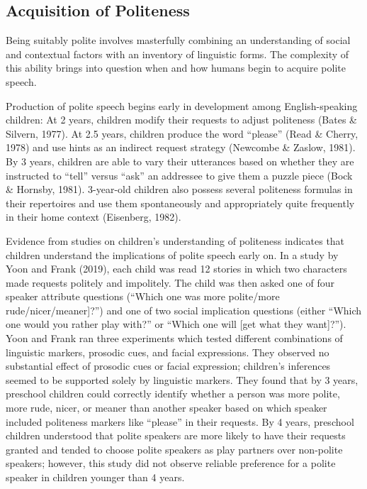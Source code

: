 \documentclass[
  english,
  man,floatsintext]{apa6}
\begin{document}
\hypertarget{acquisition-of-politeness}{%
\subsection{Acquisition of Politeness}\label{acquisition-of-politeness}}

Being suitably polite involves masterfully combining an understanding of social and contextual factors with an inventory of linguistic forms. The complexity of this ability brings into question when and how humans begin to acquire polite speech.

Production of polite speech begins early in development among English-speaking children: At 2 years, children modify their requests to adjust politeness (Bates \& Silvern, 1977). At 2.5 years, children produce the word ``please'' (Read \& Cherry, 1978) and use hints as an indirect request strategy (Newcombe \& Zaslow, 1981). By 3 years, children are able to vary their utterances based on whether they are instructed to ``tell'' versus ``ask'' an addressee to give them a puzzle piece (Bock \& Hornsby, 1981). 3-year-old children also possess several politeness formulas in their repertoires and use them spontaneously and appropriately quite frequently in their home context (Eisenberg, 1982).

Evidence from studies on children's understanding of politeness indicates that children understand the implications of polite speech early on. In a study by Yoon and Frank (2019), each child was read 12 stories in which two characters made requests politely and impolitely. The child was then asked one of four speaker attribute questions (``Which one was more polite/more rude/nicer/meaner{]}?'') and one of two social implication questions (either ``Which one would you rather play with?'' or ``Which one will {[}get what they want{]}?''). Yoon and Frank ran three experiments which tested different combinations of linguistic markers, prosodic cues, and facial expressions. They observed no substantial effect of prosodic cues or facial expression; children's inferences seemed to be supported solely by linguistic markers. They found that by 3 years, preschool children could correctly identify whether a person was more polite, more rude, nicer, or meaner than another speaker based on which speaker included politeness markers like ``please'' in their requests. By 4 years, preschool children understood that polite speakers are more likely to have their requests granted and tended to choose polite speakers as play partners over non-polite speakers; however, this study did not observe reliable preference for a polite speaker in children younger than 4 years.
\end{document}
